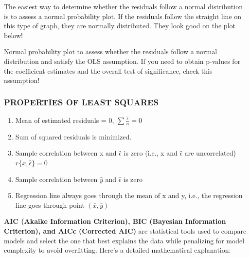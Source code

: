 \documentclass[12pt]{book}
\begin{document}
The easiest way to determine whether the residuals follow a normal distribution is to assess a normal probability plot. If the residuals follow the straight line on this type of graph, they are normally distributed. They look good on the plot below!

Normal probability plot to assess whether the residuals follow a normal distribution and satisfy the OLS assumption.
If you need to obtain p-values for the coefficient estimates and the overall test of significance, check this assumption!


\subsubsection{PROPERTIES OF LEAST SQUARES}

\begin{enumerate}
    \item Mean of estimated residuals = 0, \( \sum \frac {\hat \epsilon}{n} = 0 \)
    \item Sum of squared residuals is minimized.
    \item Sample correlation between x and \(\hat \epsilon\) is zero (i.e., x and \(\hat \epsilon\) are uncorrelated) \(r\{x, \hat \epsilon\} = 0\)
    \item Sample correlation between \(\hat y\) and \(\hat \epsilon \) is zero
    \item Regression line always goes through the mean of x and y, i.e., the regression line goes through point \((\bar x, \bar y)\)
\end{enumerate}


 \textbf{AIC (Akaike Information Criterion), BIC (Bayesian Information Criterion), and AICc (Corrected AIC)} are statistical tools used to compare models and select the one that best explains the data while penalizing for model complexity to avoid overfitting. Here’s a detailed mathematical explanation:
\end{document}
